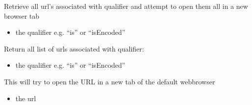 \documentclass[letterpaper,10pt,english]{sphinxmanual}
\begin{document}
\begin{fulllineitems}
\begin{fulllineitems}
\end{fulllineitems}


\begin{fulllineitems}
\label{\detokenize{modules_doc:cbmpy.CBCommon.MIRIAMannotation.getAndViewUrisForQualifier}}
\pysigstartsignatures
{}
\pysigstopsignatures
\sphinxAtStartPar
Retrieve all url’s associated with qualifier and attempt to open them all in a new browser tab
\begin{itemize}
\item {} 
\sphinxAtStartPar
{} the qualifier e.g. “is” or “isEncoded”

\end{itemize}

\end{fulllineitems}


\begin{fulllineitems}
\label{\detokenize{modules_doc:cbmpy.CBCommon.MIRIAMannotation.getMIRIAMUrisForQualifier}}
\pysigstartsignatures
{}
\pysigstopsignatures
\sphinxAtStartPar
Return all list of urls associated with qualifier:
\begin{itemize}
\item {} 
\sphinxAtStartPar
{} the qualifier e.g. “is” or “isEncoded”

\end{itemize}

\end{fulllineitems}


\begin{fulllineitems}
\label{\detokenize{modules_doc:cbmpy.CBCommon.MIRIAMannotation.viewURL}}
\pysigstartsignatures
{}
\pysigstopsignatures
\sphinxAtStartPar
This will try to open the URL in a new tab of the default webbrowser
\begin{itemize}
\item {} 
\sphinxAtStartPar
{} the url

\end{itemize}

\end{fulllineitems}


\end{fulllineitems}
\end{document}
